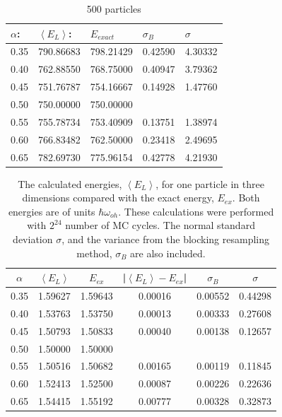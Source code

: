 \begin{table}[H]\caption{500 particles}\label{tab:brute_force_N_500}
\center
\begin{tabular}{lllll}
$\alpha$: & $\left< E_L \right>$:& $E_{exact}$ & $\sigma_B$ & $\sigma$\\ \hline
0.35 & 790.86683 & 798.21429 & 0.42590 & 4.30332\\
0.40 & 762.88550 & 768.75000 & 0.40947 & 3.79362\\
0.45 & 751.76787 & 754.16667 & 0.14928 & 1.47760\\
0.50 & 750.00000 & 750.00000 &                 &                \\ 
0.55 & 755.78734 & 753.40909 & 0.13751 & 1.38974\\
0.60 & 766.83482 & 762.50000 & 0.23418 & 2.49695\\
0.65 & 782.69730 & 775.96154 & 0.42778 & 4.21930\\
\end{tabular}
\end{table} 

\begin{table}[H]\caption{The calculated energies, $\left<E_L\right>$, for one particle in three dimensions compared with the exact energy, $E_{ex}$. Both energies are of units $\hbar\omega_{oh}$. These calculations were performed with $2^{24}$ number of MC cycles. The normal standard deviation $\sigma$, and the variance from the blocking resampling method, $\sigma_B$ are also included. }\label{tab:brute_force_N_1_MC_boost}
\center
\begin{tabular}{cccccc}
$\alpha$ & $\left< E_L \right>$ & $E_{ex}$ & |$\left< E_L \right>-E_{ex}$|  & $\sigma_B$ & $\sigma$\\ \hline
0.35 & 1.59627 & 1.59643 & 0.00016 & 0.00552 & 0.44298\\
0.40 & 1.53763 & 1.53750 & 0.00013 & 0.00333 & 0.27608\\
0.45 & 1.50793 & 1.50833 & 0.00040 & 0.00138 & 0.12657\\
0.50 & 1.50000 & 1.50000 &                &                &                 \\
0.55 & 1.50516 & 1.50682 & 0.00165 & 0.00119 & 0.11845\\
0.60 & 1.52413 & 1.52500 & 0.00087 & 0.00226 & 0.22636\\
0.65 & 1.54415 & 1.55192 & 0.00777 & 0.00328 & 0.32873\\
\end{tabular}
\end{table} 

